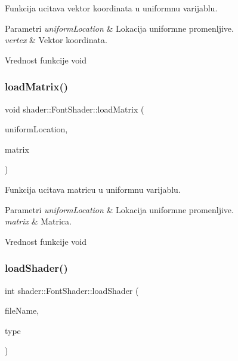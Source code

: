 Funkcija ucitava vektor koordinata u uniformnu varijablu. 


\begin{DoxyParams}{Parametri}
{\em uniform\+Location} & Lokacija uniformne promenljive. \\
\hline
{\em vertex} & Vektor koordinata. \\
\hline
\end{DoxyParams}
\begin{DoxyReturn}{Vrednost funkcije}
void 
\end{DoxyReturn}
\mbox{\label{classshader_1_1FontShader_a28f790307f575713dba18aeef06b904e}} 
\subsubsection{\texorpdfstring{load\+Matrix()}{loadMatrix()}}
{\footnotesize\ttfamily void shader\+::\+Font\+Shader\+::load\+Matrix (\begin{DoxyParamCaption}\item[{int}]{uniform\+Location,  }\item[{mat4}]{matrix }\end{DoxyParamCaption})}



Funkcija ucitava matricu u uniformnu varijablu. 


\begin{DoxyParams}{Parametri}
{\em uniform\+Location} & Lokacija uniformne promenljive. \\
\hline
{\em matrix} & Matrica. \\
\hline
\end{DoxyParams}
\begin{DoxyReturn}{Vrednost funkcije}
void 
\end{DoxyReturn}
\mbox{\label{classshader_1_1FontShader_abe3a0b4d642aa405ec8e27cf10c8543b}} 
\subsubsection{\texorpdfstring{load\+Shader()}{loadShader()}}
{\footnotesize\ttfamily int shader\+::\+Font\+Shader\+::load\+Shader (\begin{DoxyParamCaption}\item[{const char $\ast$}]{file\+Name,  }\item[{G\+Lenum}]{type }\end{DoxyParamCaption})\hspace{0.3cm}{\ttfamily [private]}}



